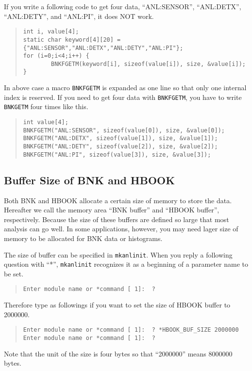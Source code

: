 If you write a following code to get four data,
``ANL:SENSOR'', ``ANL:DETX'', ``ANL:DETY'', and ``ANL:PI'',
it does NOT work.
\begin{quote}\baselineskip 3.2mm\begin{verbatim}
int i, value[4];
static char keyword[4][20] = {"ANL:SENSOR","ANL:DETX","ANL:DETY","ANL:PI"};
for (i=0;i<4;i++) {
        BNKFGETM(keyword[i], sizeof(value[i]), size, &value[i]);
}
\end{verbatim}\end{quote}
In above case a macro {\tt BNKFGETM} is expanded as one line
so that only one internal index is reserved.
If you need to get four data with {\tt BNKFGETM},
you have to write {\tt BNKGETM} four times like this.
\begin{quote}\baselineskip 3.2mm\begin{verbatim}
int value[4];
BNKFGETM("ANL:SENSOR", sizeof(value[0]), size, &value[0]);
BNKFGETM("ANL:DETX", sizeof(value[1]), size, &value[1]);
BNKFGETM("ANL:DETY", sizeof(value[2]), size, &value[2]);
BNKFGETM("ANL:PI", sizeof(value[3]), size, &value[3]);
\end{verbatim}\end{quote}

\subsection{Buffer Size of BNK and HBOOK}
Both BNK and HBOOK allocate a certain size of memory to store the data.
Hereafter we call the memory area ``BNK buffer'' and ``HBOOK buffer'',
respectively.
Because the size of these buffers are defined
so large that most analysis can go well.
In some applications, however,
you may need lager size of memory to be allocated for BNK data or histograms.

The size of buffer can be specified in {\tt mkanlinit}.
When you reply a following question with ``*'',
{\tt mkanlinit} recognizes it as a beginning of a parameter name to be set.

\begin{quote}\baselineskip 3.2mm\begin{verbatim}
Enter module name or *command [ 1]:  ?
\end{verbatim}\end{quote}

Therefore type as followings
if you want to set the size of HBOOK buffer to 2000000.
\begin{quote}\baselineskip 3.2mm\begin{verbatim}
Enter module name or *command [ 1]:  ? *HBOOK_BUF_SIZE 2000000
Enter module name or *command [ 1]:  ?
\end{verbatim}\end{quote}
Note that the unit of the size is four bytes
so that ``2000000'' means 8000000 bytes.

